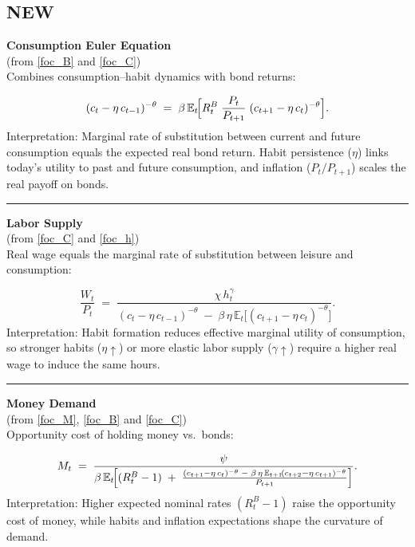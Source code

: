 \documentclass[11pt,preprint]{elsarticle}
\numberwithin{equation}{section}
\numberwithin{figure}{section}
\numberwithin{table}{section}
\begin{document}
\newpage

\subsection{NEW}\label{new}

\textbf{Consumption Euler Equation}\\
(from \eqref{foc_B} and \eqref{foc_C})\\
Combines consumption--habit dynamics with bond returns:

\[
  (c_t - \eta\,c_{t-1})^{-\theta}
  \;=\;
  \beta\,\mathbb{E}_t\!\Bigl[
    R_t^B \;\frac{P_t}{P_{t+1}}\;(c_{t+1} - \eta\,c_t)^{-\theta}
  \Bigr].
\] Interpretation: Marginal rate of substitution between current and
future consumption equals the expected real bond return. Habit
persistence (\(\eta\)) links today's utility to past and future
consumption, and inflation (\(P_t/P_{t+1}\)) scales the real payoff on
bonds.

\begin{center}\rule{0.5\linewidth}{0.5pt}\end{center}

\textbf{Labor Supply}\\
(from \eqref{foc_C} and \eqref{foc_h})\\
Real wage equals the marginal rate of substitution between leisure and
consumption:

\[
  \frac{W_t}{P_t}
  \;=\;
  \frac{\chi\,h_t^{\gamma}}
       {(c_t - \eta\,c_{t-1})^{-\theta}
        \;-\;
        \beta\,\eta\,\mathbb{E}_t\!\bigl[(c_{t+1} - \eta\,c_t)^{-\theta}\bigr]}.
\] Interpretation: Habit formation reduces effective marginal utility of
consumption, so stronger habits (\(\eta\uparrow\)) or more elastic labor
supply (\(\gamma\uparrow\)) require a higher real wage to induce the
same hours.

\begin{center}\rule{0.5\linewidth}{0.5pt}\end{center}

\textbf{Money Demand}\\
(from \eqref{foc_M}, \eqref{foc_B} and \eqref{foc_C})\\
Opportunity cost of holding money vs.~bonds:

\[
  M_t
  \;=\;
  \frac{\psi}
       {\beta\,\mathbb{E}_t\!\Bigl[
         (R_t^B - 1)
         \;+\;
         \frac{(c_{t+1} - \eta\,c_t)^{-\theta}
               \;-\;
               \beta\,\eta\,\mathbb{E}_{t+1}\!(c_{t+2} - \eta\,c_{t+1})^{-\theta}}
              {P_{t+1}}
       \Bigr]}.
\] Interpretation: Higher expected nominal rates \((R_t^B - 1)\) raise
the opportunity cost of money, while habits and inflation expectations
shape the curvature of demand.
\end{document}
